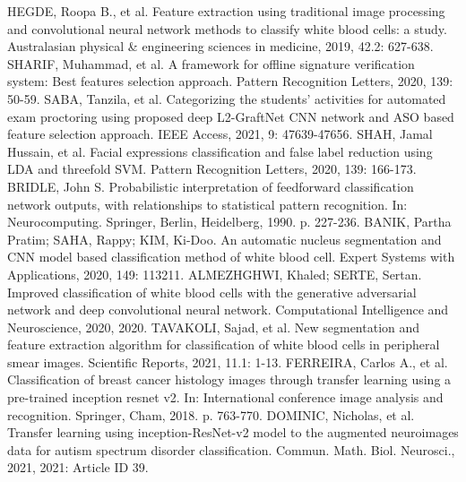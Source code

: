 \documentclass[conference]{IEEEtran}
\begin{document}
\begin{thebibliography}{00}
 HEGDE, Roopa B., et al. Feature extraction using traditional image processing and convolutional neural network methods to classify white blood cells: a study. Australasian physical & engineering sciences in medicine, 2019, 42.2: 627-638. 
 SHARIF, Muhammad, et al. A framework for offline signature verification system: Best features selection approach. Pattern Recognition Letters, 2020, 139: 50-59.
 SABA, Tanzila, et al. Categorizing the students’ activities for automated exam proctoring using proposed deep L2-GraftNet CNN network and ASO based feature selection approach. IEEE Access, 2021, 9: 47639-47656.
 SHAH, Jamal Hussain, et al. Facial expressions classification and false label reduction using LDA and threefold SVM. Pattern Recognition Letters, 2020, 139: 166-173.
 BRIDLE, John S. Probabilistic interpretation of feedforward classification network outputs, with relationships to statistical pattern recognition. In: Neurocomputing. Springer, Berlin, Heidelberg, 1990. p. 227-236.
 BANIK, Partha Pratim; SAHA, Rappy; KIM, Ki-Doo. An automatic nucleus segmentation and CNN model based classification method of white blood cell. Expert Systems with Applications, 2020, 149: 113211. 
 ALMEZHGHWI, Khaled; SERTE, Sertan. Improved classification of white blood cells with the generative adversarial network and deep convolutional neural network. Computational Intelligence and Neuroscience, 2020, 2020.
 TAVAKOLI, Sajad, et al. New segmentation and feature extraction algorithm for classification of white blood cells in peripheral smear images. Scientific Reports, 2021, 11.1: 1-13.
 FERREIRA, Carlos A., et al. Classification of breast cancer histology images through transfer learning using a pre-trained inception resnet v2. In: International conference image analysis and recognition. Springer, Cham, 2018. p. 763-770. 
 DOMINIC, Nicholas, et al. Transfer learning using inception-ResNet-v2 model to the augmented neuroimages data for autism spectrum disorder classification. Commun. Math. Biol. Neurosci., 2021, 2021: Article ID 39. 
\end{thebibliography}
\vspace{12pt}
\color{red}
\end{document}
